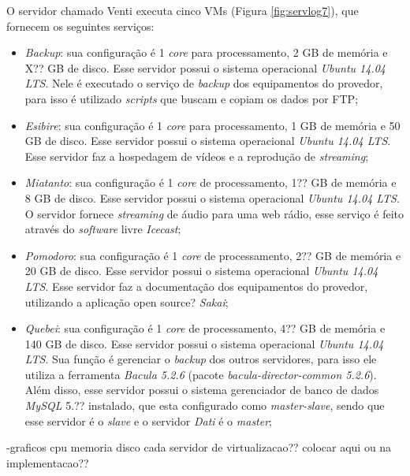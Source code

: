 O servidor chamado Venti executa cinco \ac{VM}s (Figura \ref{fig:servlog7}), que fornecem os seguintes serviços:
\begin{itemize}
 \item \textit{Backup}: sua configuração é 1 \textit{core} para processamento, 2 GB de memória e X?? GB de disco. Esse servidor possui o 
 sistema operacional \textit{Ubuntu 14.04 \ac{LTS}}. Nele é executado o serviço de \textit{backup} dos equipamentos do provedor, para isso 
 é utilizado \textit{scripts} que buscam e copiam os dados por \ac{FTP};
 
 \item \textit{Esibire}: sua configuração é 1 \textit{core} para processamento, 1 GB de memória e 50 GB de disco. Esse servidor possui o 
 sistema operacional \textit{Ubuntu 14.04 \ac{LTS}}. Esse servidor faz a hospedagem de vídeos e a reprodução de \textit{streaming};
 
 \item \textit{Miatanto}: sua configuração é 1 \textit{core} de processamento, 1?? GB de memória e 8 GB de disco. Esse servidor possui o 
 sistema operacional \textit{Ubuntu 14.04 \ac{LTS}}. O servidor fornece \textit{streaming} de áudio para uma web rádio, esse serviço é feito
 através do \textit{software} livre \textit{Icecast};
 
 \item \textit{Pomodoro}: sua configuração é 1 \textit{core} de processamento, 2?? GB de memória e 20 GB de disco. Esse servidor possui o 
 sistema operacional \textit{Ubuntu 14.04 \ac{LTS}}. Esse servidor faz a documentação dos equipamentos do provedor, utilizando a aplicação
 open source? \textit{Sakai};
 
 \item \textit{Quebei}: sua configuração é 1 \textit{core} de processamento, 4?? GB de memória e 140 GB de disco. Esse servidor possui o 
 sistema operacional \textit{Ubuntu 14.04 \ac{LTS}}. Sua função é gerenciar o \textit{backup} dos outros servidores, para isso ele utiliza a 
 ferramenta \textit{Bacula 5.2.6} (pacote \textit{bacula-director-common 5.2.6}). Além disso, esse servidor possui o sistema gerenciador de banco de dados 
 \textit{MySQL} 5.?? instalado, que esta configurado como \textit{master-slave}, sendo que esse servidor é o \textit{slave} e o servidor 
 \textit{Dati} é o \textit{master};
\end{itemize}

-graficos cpu memoria disco cada servidor de virtualizacao?? colocar aqui ou na implementacao??

